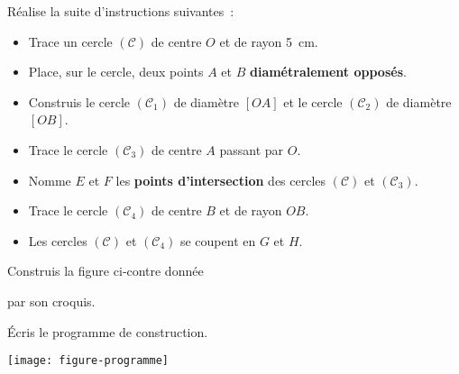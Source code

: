 \begin{activite}

 \begin{partie}
 Réalise la suite d'instructions suivantes :
 \begin{itemize}
  \item Trace un cercle $(\mathcal{C})$ de centre $O$ et de rayon 5 cm.
  \item Place, sur le cercle, deux points $A$ et $B$ \textbf{diamétralement opposés}.
  \item Construis le cercle $(\mathcal{C}_1)$ de diamètre $[OA]$ et le cercle $(\mathcal{C}_2)$ de diamètre $[OB]$.
  \item Trace le cercle $(\mathcal{C}_3)$ de centre $A$ passant par $O$.
  \item Nomme $E$ et $F$ les \textbf{points d'intersection} des cercles $(\mathcal{C})$ et $(\mathcal{C}_3)$.
  \item Trace le cercle $(\mathcal{C}_4)$ de centre $B$ et de rayon $OB$.
  \item Les cercles $(\mathcal{C})$ et $(\mathcal{C}_4)$ se coupent en $G$ et $H$.
  \end{itemize}
  
  \end{partie}
  
  \vspace{2em}
  
 \begin{partie}
 \begin{minipage}[c]{0.48\linewidth} 
Construis la figure ci‑contre donnée 

par son croquis.

Écris le programme de construction.
 \end{minipage} \hfill %
 \begin{minipage}[c]{0.46\linewidth}
 \texttt{[image: figure-programme]}
  \end{minipage} \\
  
  \end{partie}

\end{activite}

